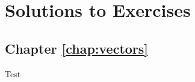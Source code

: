 \chapter{Solutions to Exercises}

\section*{Chapter \ref{chap:vectors}}

\begin{sltn}[\ref{exer:cfield}]
Test
\end{sltn}